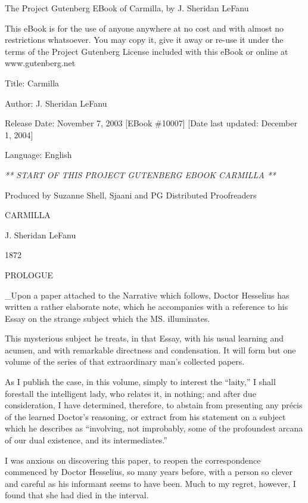 \documentclass[11pt,twoside,makeidx,hidelinks,]{memoir}
\begin{document}
  
  


  \newpage
\mainmatter
  \pagestyle{ebook}
  \sloppy

The Project Gutenberg EBook of Carmilla, by J. Sheridan LeFanu

This eBook is for the use of anyone anywhere at no cost and with
almost no restrictions whatsoever.  You may copy it, give it away or
re-use it under the terms of the Project Gutenberg License included
with this eBook or online at www.gutenberg.net

Title: Carmilla

Author: J. Sheridan LeFanu

Release Date: November 7, 2003 [EBook \#10007]
[Date last updated: December 1, 2004]

Language: English

\emph{** START OF THIS PROJECT GUTENBERG EBOOK CARMILLA **}

Produced by Suzanne Shell, Sjaani and PG Distributed Proofreaders

CARMILLA

J. Sheridan LeFanu

1872

\pbreak{}

PROLOGUE

\_Upon a paper attached to the Narrative which follows, Doctor Hesselius
has written a rather elaborate note, which he accompanies with a
reference to his Essay on the strange subject which the MS. illuminates.

This mysterious subject he treats, in that Essay, with his usual
learning and acumen, and with remarkable directness and condensation. It
will form but one volume of the series of that extraordinary man's
collected papers.

As I publish the case, in this volume, simply to interest the ``laity,'' I
shall forestall the intelligent lady, who relates it, in nothing; and
after due consideration, I have determined, therefore, to abstain from
presenting any précis of the learned Doctor's reasoning, or extract from
his statement on a subject which he describes as ``involving, not
improbably, some of the profoundest arcana of our dual existence, and
its intermediates.''

I was anxious on discovering this paper, to reopen the correspondence
commenced by Doctor Hesselius, so many years before, with a person so
clever and careful as his informant seems to have been. Much to my
regret, however, I found that she had died in the interval.
\end{document}
